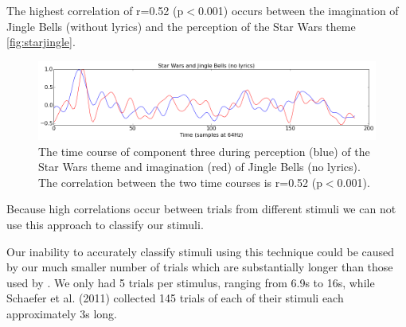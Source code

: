The highest correlation of r=0.52 (p$<$0.001) occurs between the imagination of Jingle Bells (without lyrics) and the perception of the Star Wars theme \autoref{fig:starjingle}.
\begin{figure}[htbp]
  \centerline{\includegraphics[scale=0.4]{Figures/StarJingle}}
  \caption{The time course of component three during perception (blue) of the Star Wars theme and imagination (red) of Jingle Bells (no lyrics). The correlation between the two time courses is r=0.52 (p$<$0.001).}
  \label{fig:starjingle}
\end{figure}
Because high correlations occur between trials from different stimuli we can not use this approach to classify our stimuli.

Our inability to accurately classify stimuli using this technique could be caused by our much smaller number of trials which are substantially longer than those used by \cite{schaefer_name_2011}. 
We only had 5 trials per stimulus, ranging from 6.9s to 16s, while Schaefer et al. (2011) collected 145 trials of each of their stimuli each approximately 3s long.